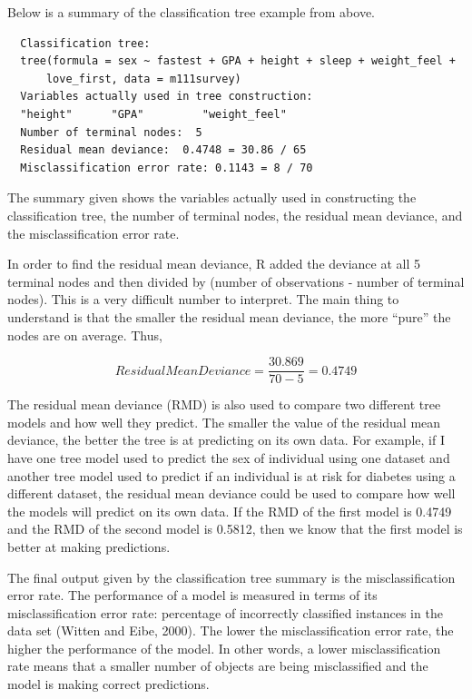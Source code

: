 \documentclass[12pt,twoside]{reedthesis}
\begin{document}
  Below is a summary of the classification tree example from above.
  
  \begin{verbatim}
  Classification tree:
  tree(formula = sex ~ fastest + GPA + height + sleep + weight_feel + 
      love_first, data = m111survey)
  Variables actually used in tree construction:
  "height"      "GPA"         "weight_feel"
  Number of terminal nodes:  5 
  Residual mean deviance:  0.4748 = 30.86 / 65 
  Misclassification error rate: 0.1143 = 8 / 70
  \end{verbatim}
  
  The summary given shows the variables actually used in constructing the
  classification tree, the number of terminal nodes, the residual mean
  deviance, and the misclassification error rate.
  
  In order to find the residual mean deviance, R added the deviance at all
  5 terminal nodes and then divided by (number of observations - number of
  terminal nodes). This is a very difficult number to interpret. The main
  thing to understand is that the smaller the residual mean deviance, the
  more ``pure'' the nodes are on average. Thus,
  
  \[ Residual Mean Deviance = \frac{30.869}{70-5} = 0.4749\]
  
  The residual mean deviance (RMD) is also used to compare two different
  tree models and how well they predict. The smaller the value of the
  residual mean deviance, the better the tree is at predicting on its own
  data. For example, if I have one tree model used to predict the sex of
  individual using one dataset and another tree model used to predict if
  an individual is at risk for diabetes using a different dataset, the
  residual mean deviance could be used to compare how well the models will
  predict on its own data. If the RMD of the first model is 0.4749 and the
  RMD of the second model is 0.5812, then we know that the first model is
  better at making predictions.
  
  The final output given by the classification tree summary is the
  misclassification error rate. The performance of a model is measured in
  terms of its misclassification error rate: percentage of incorrectly
  classified instances in the data set (Witten and Eibe, 2000). The lower
  the misclassification error rate, the higher the performance of the
  model. In other words, a lower misclassification rate means that a
  smaller number of objects are being misclassified and the model is
  making correct predictions.
  
\end{document}
